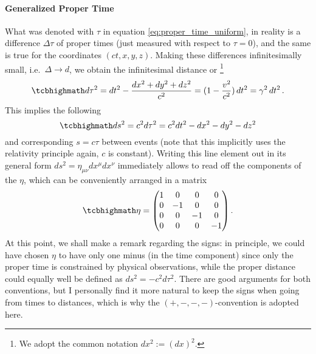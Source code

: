 		\paragraph{Generalized Proper Time}
What was denoted with $\tau$ in equation \eqref{eq:proper_time_uniform}, in reality is a difference $\Delta \tau$ of proper times (just measured with respect to $\tau = 0$), and the same is true for the coordinates $(ct, x, y, z)$. Making these differences infinitesimally small, i.e.~$\Delta \rightarrow d$, we obtain the infinitesimal distance or \footnote{We adopt the common notation $dx^2 := (dx)^2$.}
\begin{equation}
\eqbox{
d\tau^2 = dt^2 - \frac{dx^2 + dy^2 + dz^2}{c^2} = (1 - \frac{v^2}{c^2}) \, dt^2 = \gamma^2 \, dt^2
} \, .
\end{equation}
This implies the following 
\begin{equation}
\eqbox{
ds^2 = c^2 d\tau^2 = c^2 dt^2 - dx^2 - dy^2 - dz^2
}
\end{equation}
and corresponding  $s = c \tau$ between events (note that this implicitly uses the relativity principle again, $c$ is constant). Writing this line element out in its general form $ds^2 = \eta_{\mu \nu} dx^\mu dx^\nu$ immediately allows to read off the components of the  $\eta$, which can be conveniently arranged in a matrix
\begin{equation}
\eqbox{
\eta = \mqty(1 & 0 & 0 & 0 \\ 0 & -1 & 0 & 0 \\ 0 & 0 & -1 & 0 \\ 0 & 0 & 0 & -1)
} \, .
\end{equation}
At this point, we shall make a remark regarding the signs: in principle, we could have chosen $\eta$ to have only one minus (in the time component) since only the proper time is constrained by physical observations, while the proper distance could equally well be defined as $ds^2 = - c^2 d\tau^2$. There are good arguments for both conventions, but I personally find it more natural to keep the signs when going from times to distances, which is why the $(+, -, -, -)$-convention is adopted here.\\


